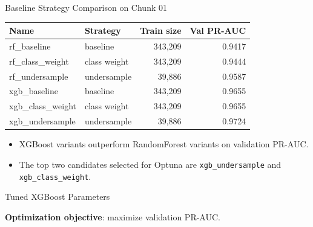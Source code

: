 \documentclass{beamer}
\begin{document}
\begin{frame}{Baseline Strategy Comparison on Chunk 01}
    \begin{table}
        \centering
        \scriptsize
        \begin{tabular}{llrr}
            \toprule
            \textbf{Name} & \textbf{Strategy} & \textbf{Train size} & \textbf{Val PR-AUC} \\
            \midrule
            rf\_baseline & baseline & 343,209 & 0.9417 \\
            rf\_class\_weight & class weight & 343,209 & 0.9444 \\
            rf\_undersample & undersample & 39,886 & 0.9587 \\
            xgb\_baseline & baseline & 343,209 & 0.9655 \\
            xgb\_class\_weight & class weight & 343,209 & 0.9655 \\
            xgb\_undersample & undersample & 39,886 & 0.9724 \\
            \bottomrule
        \end{tabular}
    \end{table}

    \vspace{0.25cm}
    \begin{itemize}
        \item XGBoost variants outperform RandomForest variants on validation PR-AUC.
        \item The top two candidates selected for Optuna are \texttt{xgb\_undersample} and \texttt{xgb\_class\_weight}.
    \end{itemize}
\end{frame}

\begin{frame}{Tuned XGBoost Parameters}
    \begin{table}
        \centering
        \scriptsize
    \end{table}

    \vspace{0.3cm}
    \textbf{Optimization objective}: maximize validation PR-AUC.
\end{frame}
\end{document}

